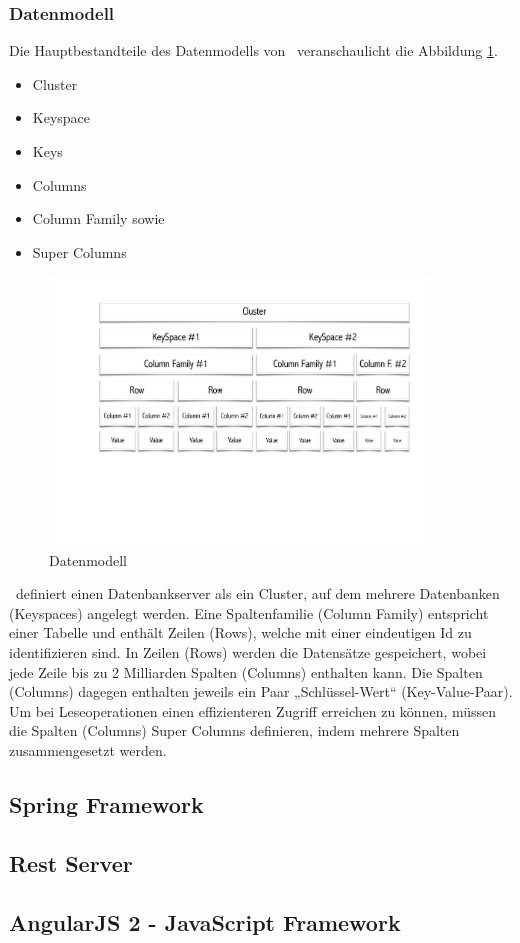 \subsubsection{Datenmodell}
Die Hauptbestandteile des Datenmodells von \cass\ veranschaulicht die Abbildung \ref{img:cassandraDataModel}.
\begin{itemize}
\item Cluster
\item Keyspace
\item Keys
\item Columns
\item Column Family sowie
\item Super Columns
\end{itemize}
\begin{figure}[H]
\centering
 \includegraphics[trim = 25mm 70mm 15mm 15mm, clip, width=0.9\textwidth]{resources/cassandra/cassandraDataModel}
\caption[Datenmodell]{Datenmodell}
\label{img:cassandraDataModel}
\end{figure}
\cass\ definiert einen Datenbankserver als ein Cluster, auf dem mehrere Datenbanken (Keyspaces) angelegt werden. Eine Spaltenfamilie (Column Family) entspricht einer Tabelle und enthält Zeilen (Rows), welche mit einer eindeutigen Id zu identifizieren sind. In Zeilen (Rows) werden die Datensätze gespeichert, wobei jede Zeile bis zu 2 Milliarden Spalten (Columns) enthalten kann. Die Spalten (Columns) dagegen enthalten jeweils ein Paar „Schlüssel-Wert“ (Key-Value-Paar). 
Um bei Leseoperationen einen effizienteren Zugriff erreichen zu können, müssen die Spalten (Columns) Super Columns definieren, indem mehrere Spalten zusammengesetzt werden.

\subsection{Spring Framework}
\subsection{Rest Server}
\subsection{AngularJS 2 - JavaScript Framework}

